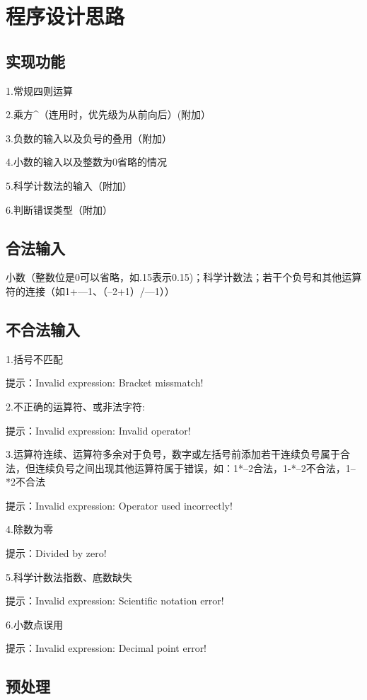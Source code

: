 \documentclass[UTF8]{ctexart}
\begin{document}
\pagestyle{fancy}
\fancyhead{}
\rhead{\today}

\section{程序设计思路}
\subsection{实现功能}
1.常规四则运算

2.乘方\textasciicircum（连用时，优先级为从前向后）(附加）

3.负数的输入以及负号的叠用（附加）

4.小数的输入以及整数为0省略的情况

5.科学计数法的输入（附加）

6.判断错误类型（附加）

\subsection{合法输入}
小数（整数位是0可以省略，如.15表示0.15)；科学计数法；若干个负号和其他运算符的连接（如1+---1、（--2+1）/---1））

\subsection{不合法输入}
1.括号不匹配

提示：Invalid expression: Bracket missmatch!

2.不正确的运算符、或非法字符:

提示：Invalid expression: Invalid operator!

3.运算符连续、运算符多余对于负号，数字或左括号前添加若干连续负号属于合法，但连续负号之间出现其他运算符属于错误，如：1*--2合法，1-*--2不合法，1--*2不合法

提示：Invalid expression: Operator used incorrectly!

4.除数为零

提示：Divided by zero!

5.科学计数法指数、底数缺失

提示：Invalid expression: Scientific notation error!

6.小数点误用

提示：Invalid expression: Decimal point error!

\subsection{预处理}
\end{document}
